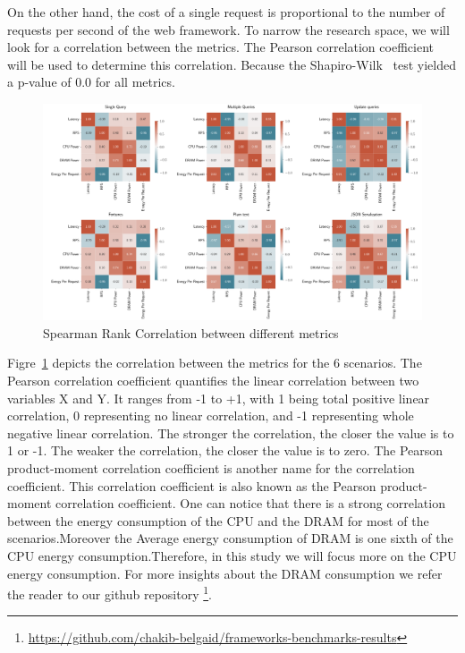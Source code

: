 On the other hand, the cost of a single request is proportional to the number of requests per second of the web framework.
To narrow the research space, we will look for a correlation between the metrics.
The Pearson correlation coefficient~\cite{zar2005spearman} will be used to determine this correlation. Because the Shapiro-Wilk~\cite{shapiro1968comparative} test yielded a p-value of 0.0 for all metrics.
\begin{figure}[htb]
    \centering
    \includegraphics[width=1.0\columnwidth]{imgs/correlation_all}
    \caption{Spearman Rank Correlation between different metrics}
    \label{fig:correlation}
\end{figure}

Figre~\ref{fig:correlation} depicts the correlation between the metrics for the 6 scenarios. The Pearson correlation coefficient quantifies the linear correlation between two variables X and Y. It ranges from -1 to +1, with 1 being total positive linear correlation, 0 representing no linear correlation, and -1 representing whole negative linear correlation. The stronger the correlation, the closer the value is to 1 or -1. The weaker the correlation, the closer the value is to zero. The Pearson product-moment correlation coefficient is another name for the correlation coefficient. This correlation coefficient is also known as the Pearson product-moment correlation coefficient.
One can notice that there is a strong correlation between the energy consumption of the CPU  and the DRAM for most of the scenarios.Moreover the Average energy consumption of DRAM is one sixth of the CPU energy consumption.Therefore, in this study we will focus more on the CPU energy consumption.
For more insights about the DRAM consumption we refer the reader to our github repository \footnote{\url{https://github.com/chakib-belgaid/frameworks-benchmarks-results}}.

